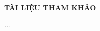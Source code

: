 \newpage
\thispagestyle{empty}

\begin{center}
    {\Large\bfseries\color{central_blue} TÀI LIỆU THAM KHẢO}
\end{center}


\begin{enumerate}[label={[{\arabic*}]}]
    \item ...
\end{enumerate}
